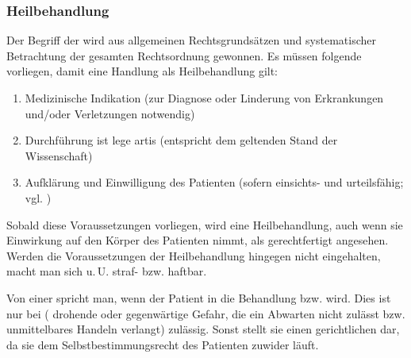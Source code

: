 \subsubsection{Heilbehandlung}


\Text
{{\TxBeschreibung}}%
{%
\label{topic:heilbehandlung}%
Der Begriff der  wird aus allgemeinen
Rechtsgrundsätzen und systematischer Betrachtung der
gesamten Rechtsordnung gewonnen.
Es müssen folgende  vorliegen, damit
eine Handlung als Heilbehandlung gilt:
\begin{enumerate}
    \item Medizinische Indikation (zur
    Diagnose oder Linderung von Erkrankungen und/oder
    Verletzungen notwendig)
    \item Durchführung ist lege artis (entspricht dem
    geltenden Stand der Wissenschaft)
    \item Aufklärung und Einwilligung des Patienten (sofern einsichts- und urteilsfähig; vgl.
    )
\end{enumerate}

Sobald diese Voraussetzungen vorliegen, wird eine
Heilbehandlung, auch wenn sie Einwirkung auf den Körper
des Patienten nimmt, als gerechtfertigt angesehen. 
Werden die Voraussetzungen der Heilbehandlung hingegen nicht
eingehalten, macht man sich u.\,U. straf- bzw.
haftbar.
}%


{\label{topic:eigenmächtige-heilbehandlung}
Von einer  spricht man,
wenn der Patient in die Behandlung  bzw.
 wird. Dies ist nur bei  ( drohende oder
gegenwärtige Gefahr, die ein Abwarten nicht zulässt bzw.
unmittelbares Handeln verlangt) zulässig. Sonst stellt
sie einen gerichtlichen 
dar, da sie dem
Selbstbestimmungsrecht des Patienten zuwider läuft.


} {}{}{}{}

